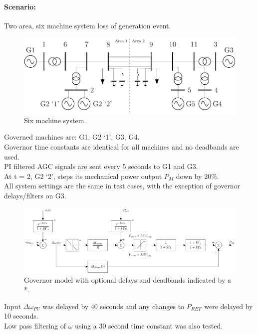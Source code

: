 \documentclass[12pt]{article}
\begin{document}
\paragraph{Scenario: } 
Two area, six machine system loss of generation event. \\
\begin{figure}[!ht]
	\centering
	\footnotesize
	\includegraphics[width=.7\linewidth]{../../models/sixMachine/sixMachine}
	\caption{Six machine system.}
	\label{fig: six machine}
\end{figure}


Governed machines are: G1, G2 `1', G3, G4.\\
Governor time constants are identical for all machines and no deadbands are used.\\
PI filtered AGC signals are sent every 5 seconds to G1 and G3.\\

At t = 2, G2 `2', steps its mechanical power output $P_M$ down by 20\%.\\

All system settings are the same in test cases, with the exception of governor delays/filters on G3.\\

\begin{figure}[!ht]
	\centering
	\footnotesize
	\includegraphics[width=.9\linewidth]{../../models/tgov1/tgov1DBdelay}
	\caption{Governor model with optional delays and deadbands indicated by a *.}
	\label{fig: modified tgov}
\end{figure}

Input $\Delta \omega_{PU}$ was delayed by 40 seconds and any changes to $P_{REF}$ were delayed by 10 seconds. \\
Low pass filtering of $\omega$ using a 30 second time constant was also tested.
\end{document}
